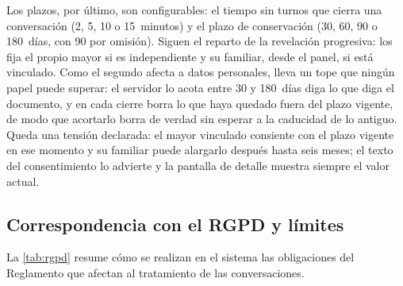 Los plazos, por último, son configurables: el tiempo sin turnos que cierra una conversación (2, 5,
10 o 15~minutos) y el plazo de conservación (30, 60, 90 o 180~días, con 90 por omisión). Siguen el reparto
de la revelación progresiva: los fija el propio mayor si es independiente y su familiar, desde el panel, si
está vinculado. Como el segundo afecta a datos personales, lleva un tope que ningún papel puede superar: el
servidor lo acota entre 30 y 180~días diga lo que diga el documento, y en cada cierre borra lo que haya
quedado fuera del plazo vigente, de modo que acortarlo borra de verdad sin esperar a la caducidad de lo
antiguo. Queda una tensión declarada: el mayor vinculado consiente con el plazo vigente en ese momento y su
familiar puede alargarlo después hasta seis meses; el texto del consentimiento lo advierte y la pantalla de
detalle muestra siempre el valor actual.

\subsection{Correspondencia con el RGPD y límites}

La \autoref{tab:rgpd} resume cómo se realizan en el sistema las obligaciones del Reglamento que afectan al
tratamiento de las conversaciones.

